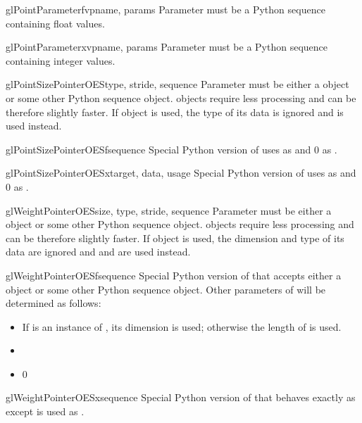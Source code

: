 \begin{funcdesc}{glPointParameterfv}{pname, params}
Parameter  must be a Python sequence containing float values.
\end{funcdesc}

\begin{funcdesc}{glPointParameterxv}{pname, params}
Parameter  must be a Python sequence containing integer values.
\end{funcdesc}

\begin{funcdesc}{glPointSizePointerOES}{type, stride, sequence}
Parameter  must be either a  object or some other
Python sequence object.  objects require less processing and
can be therefore slightly faster. If  object is used, the type
of its data is ignored and  is used instead.
\end{funcdesc}

\begin{funcdesc}{glPointSizePointerOESf}{sequence}
Special Python version of  uses  as
 and 0 as .
\end{funcdesc}

\begin{funcdesc}{glPointSizePointerOESx}{target, data, usage}
Special Python version of  uses  as
 and 0 as .
\end{funcdesc}

\begin{funcdesc}{glWeightPointerOES}{size, type, stride, sequence}
Parameter  must be either a  object or some other
Python sequence object.  objects require less processing and
can be therefore slightly faster. If  object is used, the
dimension and type of its data are ignored and  and  are
used instead.
\end{funcdesc}

\begin{funcdesc}{glWeightPointerOESf}{sequence}
Special Python version of  that accepts either a
 object or some other Python sequence object.
Other parameters of  will be determined as follows:
\begin{itemize}
\item {} If  is an instance of , its dimension is used; otherwise the length of  is used.
\item {} 
\item {} 0
\end{itemize}
\end{funcdesc}

\begin{funcdesc}{glWeightPointerOESx}{sequence}
Special Python version of  that behaves exactly as
 except  is used as .
\end{funcdesc}
